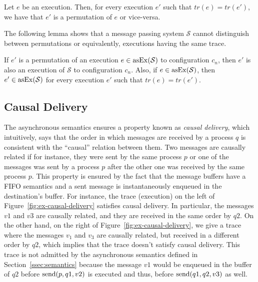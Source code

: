 \begin{lemma}
Let $e$ be an execution. Then, for every execution $e'$ such that $tr(e)=tr(e')$, we have that $e'$ is a permutation of $e$ or vice-versa. %
\end{lemma}



The following lemma shows that a message passing system $\mathcal{S}$ cannot distinguish between permutations or equivalently, executions having the same trace.

\begin{lemma}\label{lem:undist}
If $e'$ is a permutation of an execution $e\in \mathrm{asEx}({\mathcal{S}})$ to configuration $c_n$, then $e'$ is also an execution of $\mathcal{S}$ to configuration $c_n$.
Also, if $e\in \mathrm{asEx}({\mathcal{S}})$, then $e' \in \mathrm{asEx}({\mathcal{S}})$ for every execution $e'$ such that $tr(e)=tr(e')$.
\end{lemma}

\subsection{Causal Delivery}

The asynchronous semantics ensures a property known as \emph{causal delivery}, which intuitively, says that the order in which messages are received by a process $q$ is consistent with the ``causal'' relation between them. Two messages are causally related if for instance, they were sent by the same process $p$ or one of the messages was sent by a process $p$ after the other one was received by the same process $p$. This property is ensured by the fact that the message buffers have a FIFO semantics and a sent message is instantaneously enqueued in the destination's buffer. For instance, the trace (execution) on the left of Figure~\ref{fig:ex-causal-delivery} satisfies causal delivery. In particular, the messages $v1$ and $v3$ are causally related, and they are received in the same order by $q2$. On the other hand, on the right of Figure~\ref{fig:ex-causal-delivery}, we give a trace where the messages $v_1$ and $v_3$ are causally related, but received in a different order by $q2$, which implies that the trace doesn't satisfy causal delivery. This trace is not admitted by the asynchronous semantics defined in Section~\ref{ssec:semantics} because the message $v1$ would be enqueued in the buffer of $q2$ before $\mathrm{send}({p,q1,v2})$ is executed and thus, before $\mathrm{send}({q1,q2,v3})$ as well.

